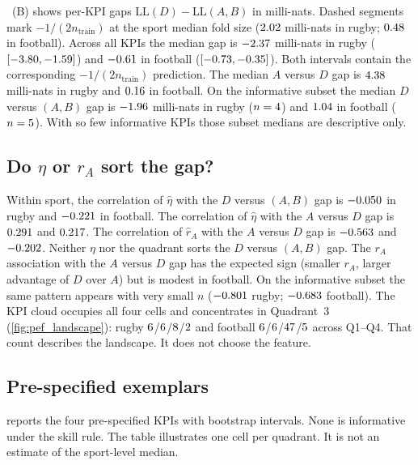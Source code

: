 ~(B) shows per-KPI gaps $\mathrm{LL}(D)-\mathrm{LL}(A,B)$ in milli-nats.
Dashed segments mark $-1/(2n_{\mathrm{train}})$ at the sport median fold size ($2.02$ milli-nats in rugby; $0.48$ in football).
Across all KPIs the median gap is $-2.37$ milli-nats in rugby ($[-3.80,-1.59]$) and $-0.61$ in football ($[-0.73,-0.35]$).
Both intervals contain the corresponding $-1/(2n_{\mathrm{train}})$ prediction.
The median $A$ versus $D$ gap is $4.38$ milli-nats in rugby and $0.16$ in football.
On the informative subset the median $D$ versus $(A,B)$ gap is $-1.96$ milli-nats in rugby ($n=4$) and $1.04$ in football ($n=5$).
With so few informative KPIs those subset medians are descriptive only.

\subsection{Do \texorpdfstring{$\eta$}{eta} or \texorpdfstring{$r_A$}{rA} sort the gap?}
\label{sec:eta_sort}

Within sport, the correlation of $\hat\eta$ with the $D$ versus $(A,B)$ gap is $-0.050$ in rugby and $-0.221$ in football.
The correlation of $\hat\eta$ with the $A$ versus $D$ gap is $0.291$ and $0.217$.
The correlation of $\hat r_A$ with the $A$ versus $D$ gap is $-0.563$ and $-0.202$.
Neither $\eta$ nor the quadrant sorts the $D$ versus $(A,B)$ gap.
The $r_A$ association with the $A$ versus $D$ gap has the expected sign (smaller $r_A$, larger advantage of $D$ over $A$) but is modest in football.
On the informative subset the same pattern appears with very small $n$ ($-0.801$ rugby; $-0.683$ football).
The KPI cloud occupies all four cells and concentrates in Quadrant~3 (\cref{fig:pef_landscape}): rugby $6$/$6$/$8$/$2$ and football $6$/$6$/$47$/$5$ across Q1--Q4.
That count describes the landscape.
It does not choose the feature.

\subsection{Pre-specified exemplars}
\label{sec:exemplars}

 reports the four pre-specified KPIs with bootstrap intervals.
None is informative under the skill rule.
The table illustrates one cell per quadrant.
It is not an estimate of the sport-level median.

